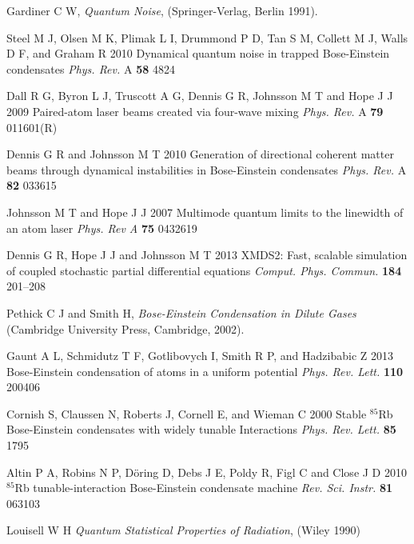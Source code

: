\documentclass{iopart}
\begin{document}
\begin{thebibliography}{10}
 Gardiner C W, \emph{Quantum Noise}, (Springer-Verlag, Berlin 1991).

 Steel M J, Olsen M K, Plimak L I, Drummond P D, Tan S M, Collett M J, Walls D F, and Graham R 2010 Dynamical quantum noise in trapped Bose-Einstein condensates \emph{Phys. Rev.} A {\bf 58} 4824

 Dall R G, Byron L J, Truscott A G, Dennis G R, Johnsson M T and Hope J J 2009 Paired-atom laser beams created via four-wave mixing \emph{Phys. Rev.} A {\bf 79} 011601(R)

 Dennis G R and Johnsson M T 2010 Generation of directional coherent matter beams through dynamical instabilities in Bose-Einstein condensates \emph{Phys. Rev.} A {\bf 82} 033615

 Johnsson M T and Hope J J 2007 Multimode quantum limits to the linewidth of an atom laser \emph{Phys. Rev A} {\bf 75} 0432619

 Dennis G R, Hope J J and Johnsson M T 2013 XMDS2: Fast, scalable simulation of coupled stochastic partial differential equations \emph{Comput. Phys. Commun.} {\bf 184} 201--208

 Pethick C J and Smith H, \emph{Bose-Einstein Condensation in Dilute Gases} (Cambridge University Press, Cambridge, 2002).

 Gaunt A L, Schmidutz T F, Gotlibovych I, Smith R P, and Hadzibabic Z 2013 Bose-Einstein condensation of atoms in a uniform potential \emph{Phys. Rev. Lett.} {\bf 110} 200406

 Cornish S, Claussen N, Roberts J, Cornell E, and Wieman C 2000 Stable $^{85}$Rb Bose-Einstein condensates with widely tunable Interactions \emph{Phys. Rev. Lett.} {\bf 85} 1795

 Altin P A, Robins N P, D{\"{o}}ring D, Debs J E, Poldy R, Figl C and Close J D 2010 $^{85}$Rb tunable-interaction Bose-Einstein condensate machine \emph{Rev. Sci. Instr.} {\bf 81} 063103

 Louisell W H \emph{Quantum Statistical Properties of Radiation}, (Wiley 1990)

\end{thebibliography}
\end{document}
